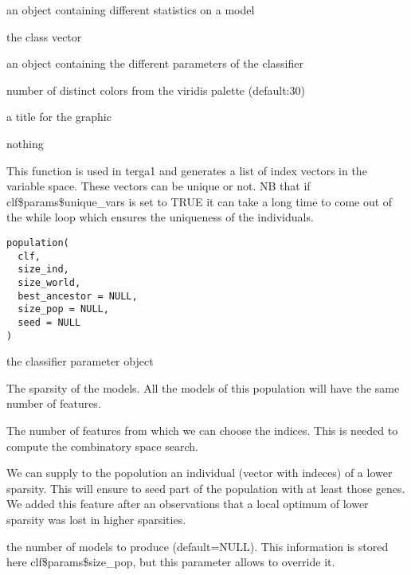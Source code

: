 \documentclass[a4paper]{book}
\begin{document}
\begin{Arguments}
\begin{ldescription}
\item[\code{dscore:}] an object containing different statistics on a model

\item[\code{y:}] the class vector

\item[\code{clf:}] an object containing the different parameters of the classifier

\item[\code{nb.col.levels:}] number of distinct colors from the viridis palette (default:30)

\item[\code{main:}] a title for the graphic
\end{ldescription}
\end{Arguments}
%
\begin{Value}
nothing
\end{Value}
%
\begin{Description}
This function is used in terga1 and generates a list of index vectors in the variable space. These vectors can be unique or not. NB that if clf\$params\$unique\_vars is set to TRUE it can take a long time to come out of the while loop which ensures the uniqueness of the individuals.
\end{Description}
%
\begin{Usage}
\begin{verbatim}
population(
  clf,
  size_ind,
  size_world,
  best_ancestor = NULL,
  size_pop = NULL,
  seed = NULL
)
\end{verbatim}
\end{Usage}
%
\begin{Arguments}
\begin{ldescription}
\item[\code{clf:}] the classifier parameter object

\item[\code{size\_ind:}] The sparsity of the models. All the models of this population will have the same number of features.

\item[\code{size\_world:}] The number of features from which we can choose the indices. This is needed to compute the combinatory space search.

\item[\code{best\_ancestor:}] We can supply to the popolution an individual (vector with indeces) of a lower sparsity. This will ensure to seed part of the population with at least those genes. We added this feature after an observations that a local optimum of lower sparsity was lost in higher sparsities.

\item[\code{size\_pop:}] the number of models to produce (default=NULL). This information is stored here clf\$params\$size\_pop, but this parameter allows to override it.
\end{ldescription}
\end{Arguments}
\end{document}
